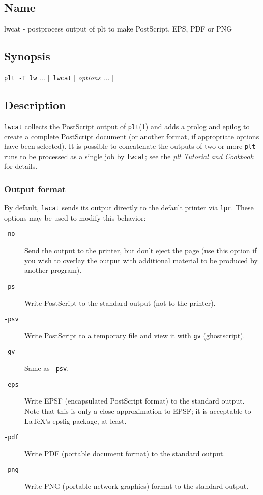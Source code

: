 \subsection*{Name}
lwcat - postprocess output of plt to make PostScript, EPS, PDF or PNG

\subsection*{Synopsis}
\texttt{plt -T lw} ... \texttt{$|$ lwcat} [ \textit{options ...} ] 
\subsection*{Description}


\texttt{lwcat} collects the PostScript
output of \textsf{\texttt{plt}(1)} and adds a prolog and epilog to create a complete PostScript
document (or another format, if appropriate options have been selected).
 It is possible to concatenate the outputs of two or more \texttt{plt} runs to be
processed as a single job by \texttt{lwcat};  see the \textit{plt Tutorial and Cookbook}
for details. 
\subsubsection*{Output format}

By default, \texttt{lwcat} sends its output directly to
the default printer via \texttt{lpr}.  These options may be used to modify this behavior:
\begin{description}
\item [\texttt{-no} ] Send the output to the printer, but don't eject the page (use this option
if you wish to overlay the output with additional material to be produced
by another program). 
\item [\texttt{-ps} ] Write PostScript to the standard output (not to
the printer). 
\item [\texttt{-psv} ] Write PostScript to a temporary file and view it with
\texttt{gv} (ghostscript). 
\item [\texttt{-gv} ] Same as \texttt{-psv}. 
\item [\texttt{-eps} ] Write EPSF (encapsulated PostScript
format) to the standard output.  Note that this is only a close approximation
to EPSF;  it is acceptable to LaTeX's epsfig package, at least. 
\item [\texttt{-pdf} ] Write
PDF (portable document format) to the standard output. 
\item [\texttt{-png} ] Write PNG (portable
network graphics) format to the standard output.  
\end{description}


